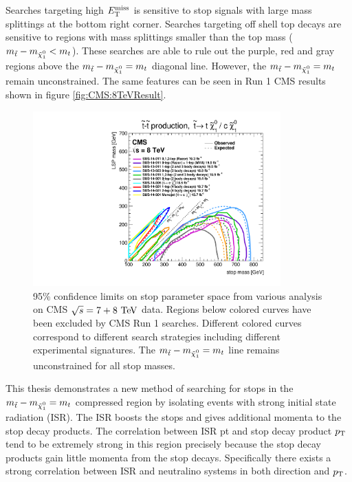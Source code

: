 \indent Searches targeting high $E_{\mathrm{T}}^{\mathrm{miss}}$ is sensitive to stop signals with large mass splittings at the bottom right corner. Searches targeting off shell top decays are sensitive to regions with mass splittings smaller than the top mass ($m_{\stop}-m_{\ninoone} < m_t$).  These searches are able to rule out the purple, red and gray regions above the $m_{\stop}-m_{\ninoone} = m_t$ diagonal line.  However, the $m_{\stop}-m_{\ninoone} = m_t$ remain unconstrained.  The same features can be seen in Run 1 CMS results shown in figure \ref{fig:CMS:8TeVResult}. \\

\begin{figure}[h!]
\centering
    \includegraphics[width=0.85\textwidth, angle=270]{figures/8TeV/T2tt_2015.pdf}\hspace{0.05\textwidth}
\caption{ 95\% confidence limits on stop parameter space from various analysis on CMS $\sqrt{s} = 7+8 \tev$ data.  Regions below colored curves have been excluded by CMS Run 1 searches.  Different colored curves correspond to different search strategies including different experimental signatures. The $m_{\stop}-m_{\ninoone} = m_t$ line remains unconstrained for all stop masses.  }
\label{fig:8TeVResult}
\end{figure}


\indent This thesis demonstrates a new method of searching for stops in the $m_{\stop}-m_{\ninoone} = m_t$ compressed region by isolating events with strong initial state radiation (ISR).  The ISR boosts the stops and gives additional momenta to the stop decay products.  The correlation between ISR pt and stop decay product $p_{\mathrm{T}}$ tend to be extremely strong in this region precisely because the stop decay products gain little momenta from the stop decays.  Specifically there exists a strong correlation between ISR and neutralino systems in both direction and $p_{\mathrm{T}}$.  \\

